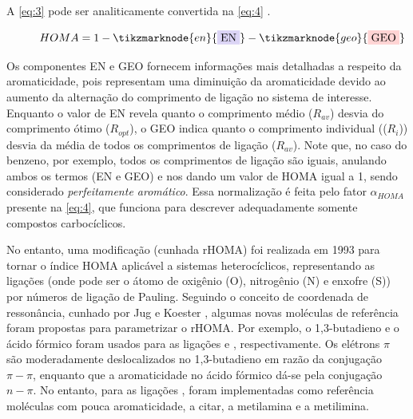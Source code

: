 A \autoref{eq:3} pode ser analiticamente convertida na \autoref{eq:4} \autocite{MarekKrygowski1998}. 

\begin{figure}[htb]
    \vspace{2\baselineskip}
\begin{equation}
    \label{eq:4}
    HOMA = 1 - \tikzmarknode{en}{\highlight{blue}{EN}} - \tikzmarknode{geo}{\highlight{red}{GEO}}
\end{equation}
\vspace{2\baselineskip}
\end{figure}

Os componentes EN e GEO fornecem informações mais detalhadas a respeito da aromaticidade, pois representam uma diminuição da aromaticidade devido ao aumento da alternação do comprimento de ligação no sistema de interesse. Enquanto o valor de EN revela quanto o comprimento médio ($R_{av}$) desvia do comprimento ótimo ($R_{opt}$), o GEO indica quanto o comprimento individual (($R_{i}$)) desvia da média de todos os comprimentos de ligação ($R_{av}$). Note que, no caso do benzeno, por exemplo, todos os comprimentos de ligação são iguais, anulando ambos os termos (EN e GEO) e nos dando um valor de \gls{HOMA} igual a 1, sendo considerado \textit{perfeitamente aromático}. Essa normalização é feita pelo fator $\alpha_{HOMA}$ presente na \autoref{eq:4}, que funciona para descrever adequadamente somente compostos carbocíclicos.

No entanto, uma modificação (cunhada \gls{rHOMA}) foi realizada em 1993 para tornar o índice \gls{HOMA} aplicável a sistemas heterocíclicos, representando as ligações  (onde  pode ser o átomo de oxigênio (O), nitrogênio (N) e enxofre (S)) por números de ligação de Pauling. Seguindo o conceito de coordenada de ressonância, cunhado por Jug e Koester \autocite{Jug1990}, algumas novas moléculas de referência foram propostas para parametrizar o \gls{rHOMA}. Por exemplo, o 1,3-butadieno e o ácido fórmico foram usados para as ligações  e , respectivamente. Os elétrons $\pi$ são moderadamente deslocalizados no 1,3-butadieno em razão da conjugação $\pi-\pi$, enquanto que a aromaticidade no ácido fórmico dá-se pela conjugação $n-\pi$. No entanto, para as ligações , foram implementadas como referência moléculas com pouca aromaticidade, a citar, a metilamina e a metilimina. 

